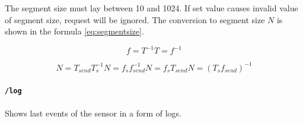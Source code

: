 The segment size must lay between 10 and 1024. If set value causes invalid value of segment size,
request will be ignored. The conversion to segment size $N$ is shown in the formula \ref{eq:segmentsize}.

\begin{subequations}
\begin{equation}
f = T^{-1}
\end{equation}
\begin{equation}
T = f^{-1}
\end{equation}
\label{eq:period_frequency}
\end{subequations}

\begin{subequations}
\begin{equation}
N = T_{send}T_s^{-1}
\end{equation}
\begin{equation}
N = f_sf_{send}^{-1}
\end{equation}
\begin{equation}
N = f_sT_{send}
\end{equation}
\begin{equation}
N = (T_sf_{send})^{-1}
\end{equation}
\label{eq:segmentsize}
\end{subequations}


\paragraph{\texttt{/log}}

Shows last events of the sensor in a form of logs.





